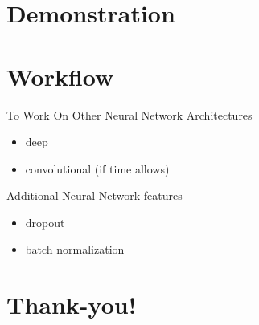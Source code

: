 \documentclass{beamer}
\begin{document}
  \section{Demonstration}

  \section{Workflow}
  \begin{frame}{To Work On}
    Other Neural Network Architectures
    \begin{itemize}
      \item deep
      \item convolutional (if time allows)
    \end{itemize}
    Additional Neural Network features
    \begin{itemize}
      \item dropout %
      \item batch normalization
    \end{itemize}
  \end{frame}

  \section{Thank-you!}
\end{document}
